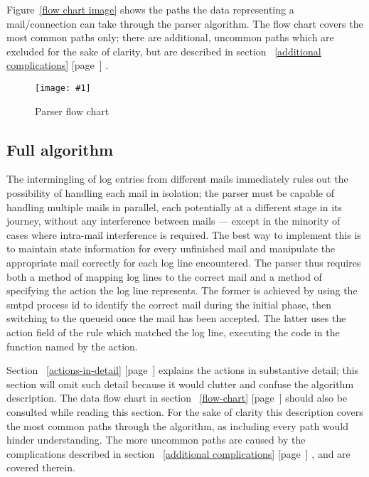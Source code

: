 \documentclass[a4paper,12pt,draft]{article}
\newcommand{\showgraph}[3]{
    \begin{figure}[hbt!]
        \caption{#2}\label{#3}
        \texttt{[image: \#1]}
    \end{figure}
}
\newcommand{\refwithpage}[1]{%
    \empty{}\ref{#1} [page~\pageref{#1}]%
}
\begin{document}
\label{flow-chart}

Figure~\ref{flow chart image} shows the paths the data representing a
mail/connection can take through the parser algorithm.  The flow chart
covers the most common paths only; there are additional, uncommon paths
which are excluded for the sake of clarity, but are described in
section~\refwithpage{additional complications}.

\showgraph{build/logparser-flow-chart.ps}{Parser flow chart}{flow chart
image}
\clearpage

\subsection{Full algorithm}

\label{full-algorithm}

The intermingling of log entries from different mails immediately rules out
the possibility of handling each mail in isolation; the parser must be
capable of handling multiple mails in parallel, each potentially at a
different stage in its journey, without any interference between mails ---
except in the minority of cases where intra-mail interference is required.
The best way to implement this is to maintain state information for every
unfinished mail and manipulate the appropriate mail correctly for each log
line encountered.  The parser thus requires both a method of mapping log
lines to the correct mail and a method of specifying the action the log
line represents.  The former is achieved by using the smtpd process id to
identify the correct mail during the initial phase, then switching to the
queueid once the mail has been accepted.  The latter uses the action field
of the rule which matched the log line, executing the code in the function
named by the action.

Section~\refwithpage{actions-in-detail} explains the actions in substantive
detail; this section will omit such detail because it would clutter and
confuse the algorithm description.  The data flow chart in
section~\refwithpage{flow-chart} should also be consulted while reading
this section.  For the sake of clarity this description covers the most
common paths through the algorithm, as including every path would hinder
understanding.  The more uncommon paths are caused by the complications
described in section~\refwithpage{additional complications}, and are
covered therein.
\end{document}
